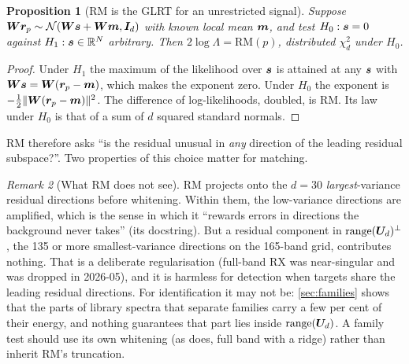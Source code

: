 \documentclass[11pt,a4paper]{article}
\theoremstyle{plain}
\newtheorem{proposition}{Proposition}[section]
\theoremstyle{definition}
\theoremstyle{remark}
\newtheorem{remark}[proposition]{Remark}
\newcommand{\R}{\mathbb{R}}
\newcommand{\rng}{\operatorname{range}}
\newcommand{\rv}{\B{r}}
\newcommand{\Wm}{\B{W}}
\newcommand{\Um}{\B{U}}
\newcommand{\Id}{\B{I}}
\newcommand{\nrm}[1]{\lVert #1\rVert}
\begin{document}
\begin{proposition}[RM is the GLRT for an unrestricted signal]
\label{prop:rm-glrt}
Suppose $\Wm\rv_p\sim\mathcal N(\Wm\B s+\Wm\B m,\Id_d)$ with known local mean $\bm{m}$, and test
$H_0:\bm{s}=0$ against $H_1:\B s\in\R^N$ arbitrary. Then $2\log\Lambda=\mathrm{RM}(p)$, distributed
$\chi^2_d$ under $H_0$.
\end{proposition}
\begin{proof}
Under $H_1$ the maximum of the likelihood over $\bm{s}$ is attained at any $\bm{s}$ with
$\Wm\B s=\Wm(\rv_p-\B m)$, which makes the exponent zero. Under $H_0$ the exponent is
$-\tfrac12\nrm{\Wm(\rv_p-\B m)}^2$. The difference of log-likelihoods, doubled, is RM. Its law under $H_0$ is
that of a sum of $d$ squared standard normals.
\end{proof}

RM therefore asks ``is the residual unusual in \emph{any} direction of the leading residual subspace?''. Two
properties of this choice matter for matching.

\begin{remark}[What RM does not see]
\label{rem:rm-blind}
RM projects onto the $d=30$ \emph{largest}-variance residual directions before whitening. Within them, the
low-variance directions are amplified, which is the sense in which it ``rewards errors in directions the background
never takes'' (its docstring). But a residual component in $\rng(\Um_d)^\perp$, the 135 or more smallest-variance
directions on the 165-band grid, contributes nothing. That is a deliberate regularisation (full-band RX was
near-singular and was dropped in 2026-05), and it is harmless for detection when targets share the leading
residual directions. For identification it may not be: \cref{sec:families} shows that the parts of library spectra
that separate families carry a few per cent of their energy, and nothing guarantees that part lies inside
$\rng(\Um_d)$. A family test should use its own whitening (as  does, full band with a ridge)
rather than inherit RM's truncation.
\end{remark}
\end{document}
